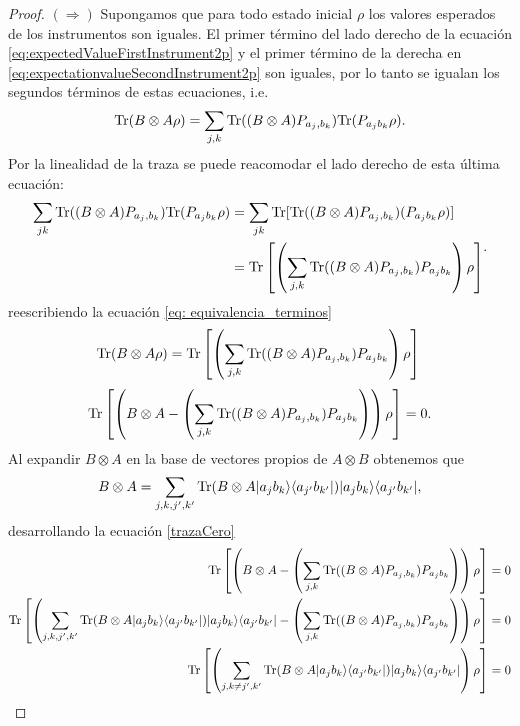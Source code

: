 \begin{proof}
    $(\Rightarrow)$ Supongamos que para todo estado inicial $\rho$ los valores
esperados de los instrumentos son iguales. El primer término del lado derecho
de la ecuación {\eqref{eq:expectedValueFirstInstrument2p}} y el primer término
de la derecha en {\eqref{eq:expectationvalueSecondInstrument2p}} son iguales,
por lo tanto se igualan los segundos términos de estas ecuaciones,
i.e.\begin{equation}\label{eq: equivalencia_terminos}{\rm Tr}(B\otimes A
\rho)=\sum_{j,k}{\rm Tr}((B\otimes A) P_{a_j,b_k}){\rm Tr}(P_{a_j b_k}\rho
).\end{equation} Por la linealidad de la traza se puede reacomodar el lado
derecho de esta última ecuación: 
\[\begin{split}\sum_{jk}{\rm Tr}((B\otimes A)
P_{a_j,b_k}){\rm Tr}(P_{a_j b_k}\rho )&= \sum_{jk}{\rm Tr}[{\rm Tr}((B\otimes A)
P_{a_j,b_k})(P_{a_j b_k}\rho )]\\
        &={\rm Tr}\left[\left(\sum_{j,k}{\rm Tr}((B\otimes A) P_{a_j,b_k})P_{a_j b_k}\right)\rho \right]\end{split}.\]  reescribiendo la ecuación {\ref{eq: equivalencia_terminos}} 
        \[{\rm Tr}(B\otimes A \rho)={\rm Tr}\left[\left(\sum_{j,k}{\rm Tr}((B\otimes A) P_{a_j,b_k})P_{a_j b_k}\right)\rho \right]\\ \]
    \begin{equation}\label{trazaCero}\begin{split}
        {\rm Tr}\left[\left(B\otimes A-\left(\sum_{j,k}{\rm Tr}((B\otimes A) P_{a_j,b_k})P_{a_j b_k}\right)\right)\rho \right]=0\\ \end{split}.\end{equation}
        Al expandir $B\otimes A$ en la base de vectores propios de $A\otimes B$ obtenemos que \[B\otimes A=\sum_{j,k,j',k'}{\rm Tr}(B\otimes A |a_j b_k\rangle \langle a_{j'}b_{k'}|)|a_j b_k\rangle \langle a_{j'}b_{k'}|,\] desarrollando la ecuación {\ref{trazaCero}}   
    \[\begin{split}
        \tr\left[\left(B\otimes A-\left(\sum_{j,k}\tr((B\otimes A) P_{a_j,b_k})P_{a_j b_k}\right)\right)\rho\right]&=0\\
    \tr\left[\left(\sum_{j,k,j',k'}\tr(B\otimes A |a_j b_k\rala a_{j'}b_{k'}|)|a_j b_k\rala a_{j'}b_{k'}|-\left(\sum_{j,k}\tr((B\otimes A) P_{a_j,b_k})P_{a_j b_k}\right)\right)\rho\right]&=0\\
    \tr\left[\left(\sum_{j,k\ne j',k'}\tr(B\otimes A |a_j b_k\rala a_{j'}b_{k'}|)|a_j b_k\rala a_{j'}b_{k'}|\right)\rho\right]&=0\\

\end{split}\]
\end{proof}
